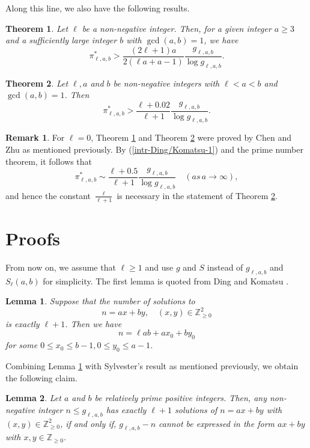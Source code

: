 \documentclass[12pt,a4paper,reqno]{amsart}
\numberwithin{equation}{section}
\def\Z{{\mathbb Z}}
\theoremstyle{plain}
\newtheorem{theorem}{Theorem}
\newtheorem{lemma}{Lemma}
\theoremstyle{definition}
\newtheorem{remark}{Remark}
\begin{document}
Along this line, we also have the following results.
\begin{theorem}\label{th:22}
	Let $\ell$ be a non-negative integer.
	Then, for a given integer $a\ge 3$ and a sufficiently large integer $b$ with $\gcd(a,b)=1$, we have
	$$   
	\pi^{*}_{\ell,a,b}>\frac{(2\ell+1)a}{2(\ell a+a-1)}\frac{g_{\ell,a,b}}{\log g_{\ell,a,b}}.
	$$ 
\end{theorem}  
\begin{theorem}\label{thm-4}
	Let $\ell,a$ and $b$ be non-negative integers with $\ell<a<b$ and $\gcd(a,b)=1$. Then
	\begin{equation*}
		\pi^{*}_{\ell,a,b}>  \frac{\ell+0.02}{\ell+1}\frac{g_{\ell,a,b}}{\log g_{\ell,a,b}}.
	\end{equation*}
\end{theorem}
\begin{remark}
	For $\ell=0$, Theorem \ref{th:22} and Theorem \ref{thm-4} were proved by Chen and Zhu \cite{Chen/Zhu-2} as mentioned previously. By (\ref{intr-Ding/Komatsu-1}) and the prime number theorem, it follows that
	$$
	\pi^{*}_{\ell,a,b}\sim \frac{\ell+0.5}{\ell+1} \frac{g_{\ell,a,b}}{\log g_{\ell,a,b}} \quad (as \, a\to\infty),
	$$ and hence the constant $\frac{\ell}{\ell+1}$ is necessary in the statement of Theorem  \ref{thm-4}.
\end{remark}

\section{Proofs} 
 From now on, we assume that $\ell\geq 1$ and use $g$ and $S$ instead of $g_{\ell,a,b}$ and $S_{\ell}(a,b)$ for simplicity.
The first lemma is quoted from Ding and Komatsu \cite[Lemma 2]{Ding/Komatsu}.
 \begin{lemma}\label{lem-5-1}
 	Suppose that the number of solutions to
 	$$ n=ax+by, \quad (x,y)\in \Z_{\geq 0}^{2}$$
 	is exactly $\ell+1$. Then we have 
 	$$
 	n=\ell ab+ax_{0}+by_{0}
 	$$
 	for some $0\leq x_{0}\leq b-1,0\leq y_{0}\leq a-1$.
 \end{lemma}
  Combining Lemma \ref{lem-5-1} with Sylvester's result as mentioned previously, we obtain the following claim.
 \begin{lemma}\label{lem-5}
 Let $a$ and $b$ be relatively prime positive integers. Then, any non-negative integer $n\leq g_{\ell,a,b}$ has exactly $\ell+1$ solutions of $n=ax+by$ with $(x,y)\in\Z_{\geq 0}^{2}$, if and only if, $g_{\ell,a,b}-n$ cannot be expressed in the form $ax+by$ with $x,y\in\Z_{\geq 0}$. 
 \end{lemma}
 
\end{document}
